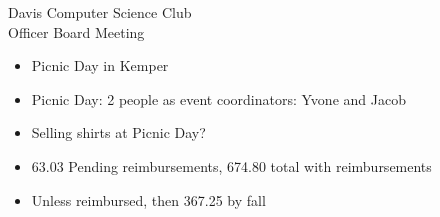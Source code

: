 \documentclass{article}
\begin{document}
\begin{Minutes}{Davis Computer Science Club\\Officer Board Meeting}
\begin {itemize}
    \item Picnic Day in Kemper
\end {itemize}

\begin {itemize}
    \item Picnic Day: 2 people as event coordinators: Yvone and Jacob
    \item Selling shirts at Picnic Day?
    \item 63.03 Pending reimbursements, 674.80 total with reimbursements
    \item Unless reimbursed, then 367.25 by fall
\end {itemize}

\end{Minutes}
\thispagestyle{creditfooter}
\end{document}
